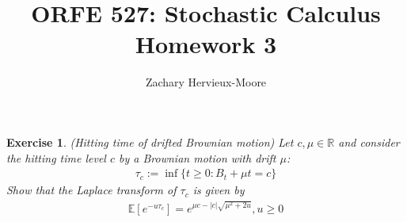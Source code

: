 \documentclass[12pt]{article}
\title{ORFE 527: Stochastic Calculus \\ Homework 3}
\author{Zachary Hervieux-Moore}
\date{\displaydate{date}}
\theoremstyle{colon}
\newtheorem{exercise}{Exercise}
\begin{document}
\maketitle

\clearpage

\begin{exercise}
  (Hitting time of drifted Brownian motion) Let $c, \mu \in \mathbb{R}$ and consider the hitting time level $c$ by a Brownian motion with drift $\mu$:
  \begin{gather*}
    \tau_c := \inf \{ t \geq 0 : B_t + \mu t = c \}
  \end{gather*}
  Show that the Laplace transform of $\tau_c$ is given by
  \begin{gather*}
    \mathbb{E} [e^{-u \tau_c}] = e^{\mu c - \lvert c \rvert \sqrt{\mu^2 + 2u}}, u \geq 0
  \end{gather*}
\end{exercise}
\end{document}
